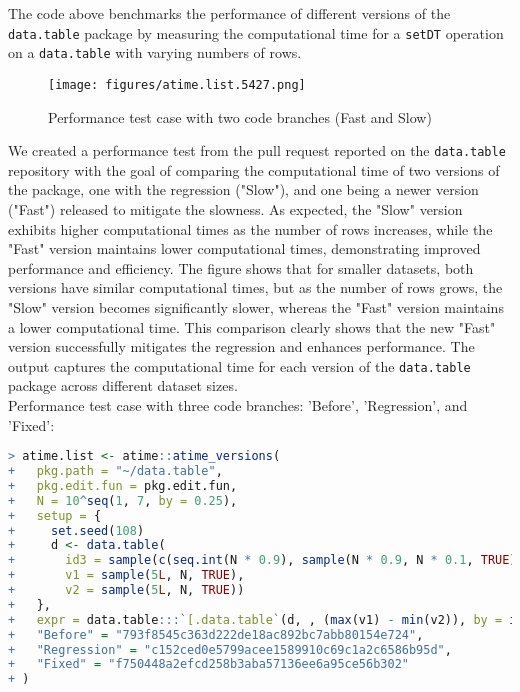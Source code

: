 \noindent The code above benchmarks the performance of different versions of the \texttt{data.table} package by measuring the computational time for a \texttt{setDT} operation on a \texttt{data.table} with varying numbers of rows.\\

\begin{figure}[H]
    \centering
    \texttt{[image: figures/atime.list.5427.png]}
     \caption{Performance test case with two code branches (Fast and Slow)}
    \label{fig:label3}
\end{figure}

\noindent \noindent We created a performance test from the pull request reported on the \texttt{data.table} repository with the goal of comparing the computational time of two versions of the package, one with the regression ("Slow"), and one being a newer version ("Fast") released to mitigate the slowness. As expected, the "Slow" version exhibits higher computational times as the number of rows increases, while the "Fast" version maintains lower computational times, demonstrating improved performance and efficiency. The figure shows that for smaller datasets, both versions have similar computational times, but as the number of rows grows, the "Slow" version becomes significantly slower, whereas the "Fast" version maintains a lower computational time. This comparison clearly shows that the new "Fast" version successfully mitigates the regression and enhances performance. The output captures the computational time for each version of the \texttt{data.table} package across different dataset sizes.\\

\noindent Performance test case with three code branches: 'Before', 'Regression', and 'Fixed': \\

\begin{lstlisting}[language=R]
> atime.list <- atime::atime_versions(
+   pkg.path = "~/data.table",
+   pkg.edit.fun = pkg.edit.fun,
+   N = 10^seq(1, 7, by = 0.25),
+   setup = { 
+     set.seed(108)
+     d <- data.table(
+       id3 = sample(c(seq.int(N * 0.9), sample(N * 0.9, N * 0.1, TRUE))),
+       v1 = sample(5L, N, TRUE),
+       v2 = sample(5L, N, TRUE))
+   },
+   expr = data.table:::`[.data.table`(d, , (max(v1) - min(v2)), by = id3),
+   "Before" = "793f8545c363d222de18ac892bc7abb80154e724",
+   "Regression" = "c152ced0e5799acee1589910c69c1a2c6586b95d",
+   "Fixed" = "f750448a2efcd258b3aba57136ee6a95ce56b302"
+ )
\end{lstlisting}

